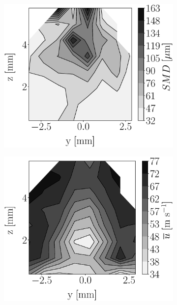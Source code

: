 \begin{figure}[h!]
\flushleft
\begin{subfigure}[b]{0.22\textwidth}
	\centering
   \includegraphics[scale=0.17]{./part2_developments/figures_ch5_resolved_JICF/injectors_SLI/uG75_dx20_x15_SMD_map.eps}
\end{subfigure}
   \hspace{0.17in}
\begin{subfigure}[b]{0.22\textwidth}
	\centering
   \includegraphics[scale=0.17]{./part2_developments/figures_ch5_resolved_JICF/injectors_SLI/uG75_dx20_x15_ux_mean_map.eps}

\end{subfigure}
\end{figure}
